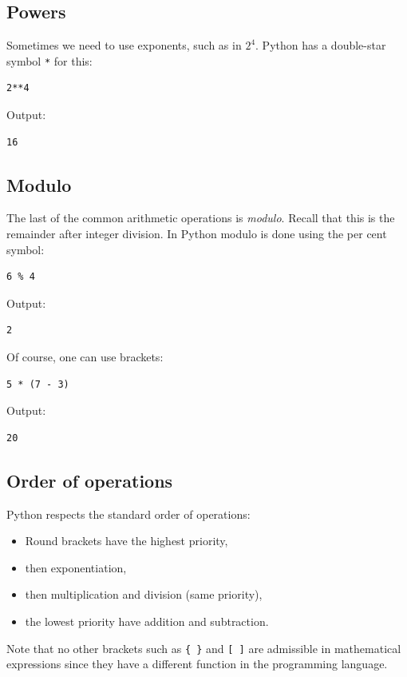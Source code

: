 \documentclass[article,A4,12pt]{llncs}
\begin{document}
\subsection{Powers}
Sometimes we need to use exponents, such as in $2^4$. Python has a double-star
symbol {\tt **} for this:

\begin{verbatim}
2**4
\end{verbatim}
Output:

\begin{verbatim}
16
\end{verbatim}
\subsection{Modulo}
The last of the common arithmetic operations is {\em modulo}. Recall that this is the remainder 
after integer division. In Python modulo is done using the per cent symbol:

\begin{verbatim}
6 % 4
\end{verbatim}
Output:

\begin{verbatim}
2
\end{verbatim}
Of course, one can use brackets:

\begin{verbatim}
5 * (7 - 3)
\end{verbatim}
Output:

\begin{verbatim}
20
\end{verbatim}
\subsection{Order of operations}
Python respects the standard order of operations:

\begin{itemize} 
\item Round brackets have the highest priority,
\item then exponentiation, 
\item then multiplication and division (same priority),
\item the lowest priority have addition and subtraction.
\end{itemize}
Note that no other brackets such as {\tt \{ \}} and {\tt [ ]} are 
admissible in mathematical expressions since they have a different 
function in the programming language.
\end{document}
